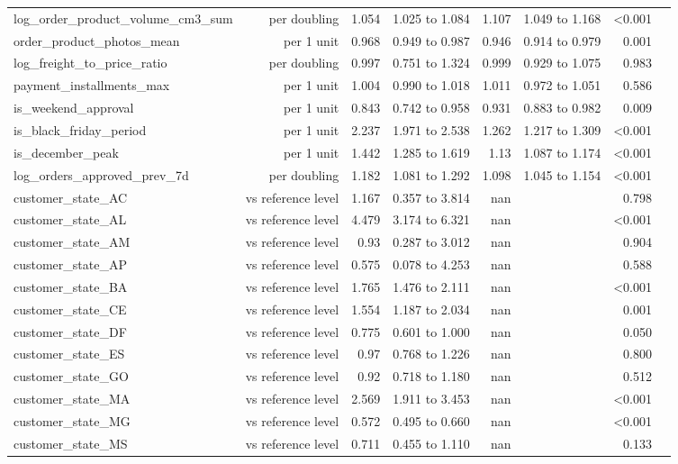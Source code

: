 \begin{table}[htbp]
\begin{tabular}{lrrrrrrr}
log\_order\_product\_volume\_cm3\_sum & per doubling & 1.054 & 1.025 to 1.084 & 1.107 & 1.049 to 1.168 & <0.001 &  \\
order\_product\_photos\_mean & per 1 unit & 0.968 & 0.949 to 0.987 & 0.946 & 0.914 to 0.979 & 0.001 &  \\
log\_freight\_to\_price\_ratio & per doubling & 0.997 & 0.751 to 1.324 & 0.999 & 0.929 to 1.075 & 0.983 &  \\
payment\_installments\_max & per 1 unit & 1.004 & 0.990 to 1.018 & 1.011 & 0.972 to 1.051 & 0.586 &  \\
is\_weekend\_approval & per 1 unit & 0.843 & 0.742 to 0.958 & 0.931 & 0.883 to 0.982 & 0.009 &  \\
is\_black\_friday\_period & per 1 unit & 2.237 & 1.971 to 2.538 & 1.262 & 1.217 to 1.309 & <0.001 &  \\
is\_december\_peak & per 1 unit & 1.442 & 1.285 to 1.619 & 1.13 & 1.087 to 1.174 & <0.001 &  \\
log\_orders\_approved\_prev\_7d & per doubling & 1.182 & 1.081 to 1.292 & 1.098 & 1.045 to 1.154 & <0.001 &  \\
customer\_state\_AC & vs reference level & 1.167 & 0.357 to 3.814 & nan &  & 0.798 &  \\
customer\_state\_AL & vs reference level & 4.479 & 3.174 to 6.321 & nan &  & <0.001 &  \\
customer\_state\_AM & vs reference level & 0.93 & 0.287 to 3.012 & nan &  & 0.904 &  \\
customer\_state\_AP & vs reference level & 0.575 & 0.078 to 4.253 & nan &  & 0.588 &  \\
customer\_state\_BA & vs reference level & 1.765 & 1.476 to 2.111 & nan &  & <0.001 &  \\
customer\_state\_CE & vs reference level & 1.554 & 1.187 to 2.034 & nan &  & 0.001 &  \\
customer\_state\_DF & vs reference level & 0.775 & 0.601 to 1.000 & nan &  & 0.050 &  \\
customer\_state\_ES & vs reference level & 0.97 & 0.768 to 1.226 & nan &  & 0.800 &  \\
customer\_state\_GO & vs reference level & 0.92 & 0.718 to 1.180 & nan &  & 0.512 &  \\
customer\_state\_MA & vs reference level & 2.569 & 1.911 to 3.453 & nan &  & <0.001 &  \\
customer\_state\_MG & vs reference level & 0.572 & 0.495 to 0.660 & nan &  & <0.001 &  \\
customer\_state\_MS & vs reference level & 0.711 & 0.455 to 1.110 & nan &  & 0.133 &  \\

\end{tabular}
\end{table}
